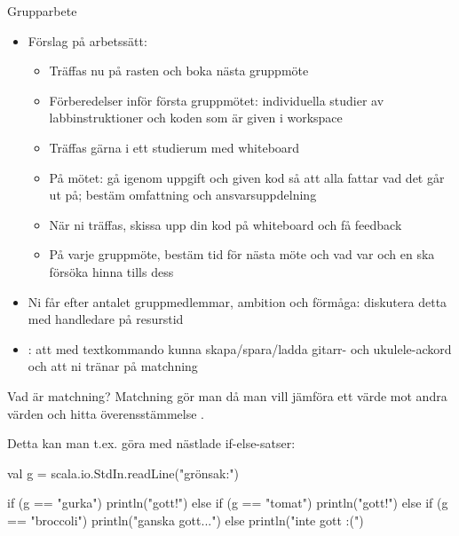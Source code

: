 \begin{Slide}{Grupparbete}\SlideFontSmall
\begin{itemize}
\item Förslag på arbetssätt:
\begin{itemize}\SlideFontSmall
\item Träffas nu på rasten och boka nästa gruppmöte
\item Förberedelser inför första gruppmötet: individuella studier av labbinstruktioner och koden som är given i workspace
\item Träffas gärna i ett studierum med whiteboard
\item På mötet: gå igenom uppgift och given kod så att alla fattar vad det går ut på; bestäm omfattning och ansvarsuppdelning
\item När ni träffas, skissa upp din kod på whiteboard och få feedback
\item På varje gruppmöte, bestäm tid för nästa möte och vad var och en ska försöka hinna tills dess
\end{itemize}


\item Ni får  efter antalet gruppmedlemmar, ambition och förmåga: diskutera detta med handledare på resurstid

\item {}: att med textkommando kunna skapa/spara/ladda gitarr- och ukulele-ackord och att ni tränar på matchning

\end{itemize}
\end{Slide}


\begin{Slide}{Vad är matchning?}
Matchning gör man då man vill jämföra ett värde mot andra värden och hitta överensstämmelse .

\pause

\vspace{1em}Detta kan man t.ex. göra med nästlade if-else-satser:

\begin{Code}
val g = scala.io.StdIn.readLine("grönsak:")

if (g == "gurka") println("gott!")
else if (g == "tomat") println("gott!")
else if (g == "broccoli") println("ganska gott...")
else println("inte gott :(")
\end{Code}
\end{Slide}
\fi

